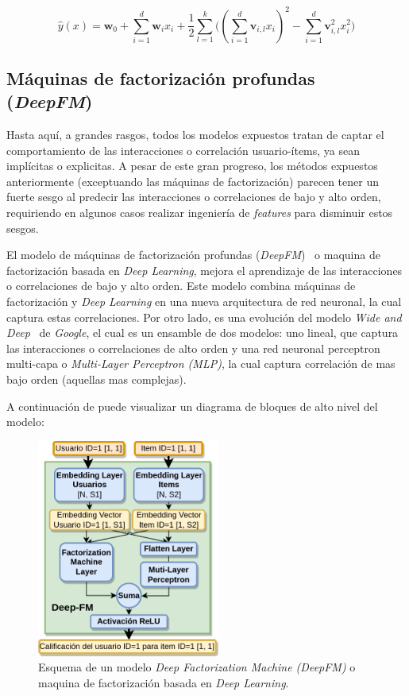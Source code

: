 \documentclass[11pt,a4paper,twoside]{thesis}
\begin{document}
\begin{equation}
	\hat{y}(x) = \mathbf{w}_0 + \sum_{i=1}^d \mathbf{w}_i x_i + \frac{1}{2} \sum_{l=1}^k \big ((\sum_{i=1}^d \mathbf{v}_{i, l} x_i)^2 - \sum_{i=1}^d \mathbf{v}_{i, l}^2 x_i^2)
\end{equation}

\clearpage

\subsection{Máquinas de factorización profundas (\textit{DeepFM})}

Hasta aquí, a grandes rasgos, todos los modelos expuestos tratan de captar el
comportamiento de las interacciones o correlación usuario-ítems, ya sean
implícitas o explicitas. A pesar de este gran progreso, los métodos expuestos
anteriormente (exceptuando las máquinas de factorización) parecen tener un
fuerte sesgo al predecir las interacciones o correlaciones de bajo y alto
orden, requiriendo en algunos casos realizar ingeniería de \textit{features}
para disminuir estos sesgos.

El modelo de máquinas de factorización profundas
(\textit{DeepFM})~\cite{dfmpaper, didldfm} o maquina de factorización basada en
\textit{Deep Learning}, mejora el aprendizaje de las interacciones o
correlaciones de bajo y alto orden. Este modelo combina máquinas de
factorización y \textit{Deep Learning} en una nueva arquitectura de red
neuronal, la cual captura estas correlaciones. Por otro lado, es una evolución
del modelo \textit{Wide and Deep}~\cite{wideanddeeppaper} de \textit{Google},
el cual es un ensamble de dos modelos: uno lineal, que captura las
interacciones o correlaciones de alto orden y una red neuronal perceptron
multi-capa o \textit{Multi-Layer Perceptron (MLP)}, la cual captura correlación
de mas bajo orden (aquellas mas complejas).

A continuación de puede visualizar un diagrama de bloques de alto nivel del
modelo:

\begin{figure}[h!]
	\centering
	\includegraphics[width=6cm]{./images/Deep-MF.png}
	\caption{
		Esquema de un modelo \textit{Deep Factorization Machine (DeepFM)} o maquina
		de factorización basada en \textit{Deep Learning}.
	}
	\label{fig:DeepMFModel}
\end{figure}
\end{document}
